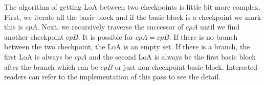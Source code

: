 The algorithm of getting LoA between two checkpoints is little bit more complex.
First, we iterate all the basic block and if the basic block is a checkpoint we
mark this is $cpA$. Next, we recursively traverse the successor of $cpA$ until
we find another checkpoint $cpB$. It is possible for $cpA = cpB$. If there is no
branch between the two checkpoint, the LoA is an empty set. If there is a
branch, the first LoA is always be $cpA$ and the second LoA is always be the
first basic block after the branch \textemdash{} which can be $cpB$ or just non
checkpoint basic block. Interested readers can refer to the implementation of
this pass to see the detail.
